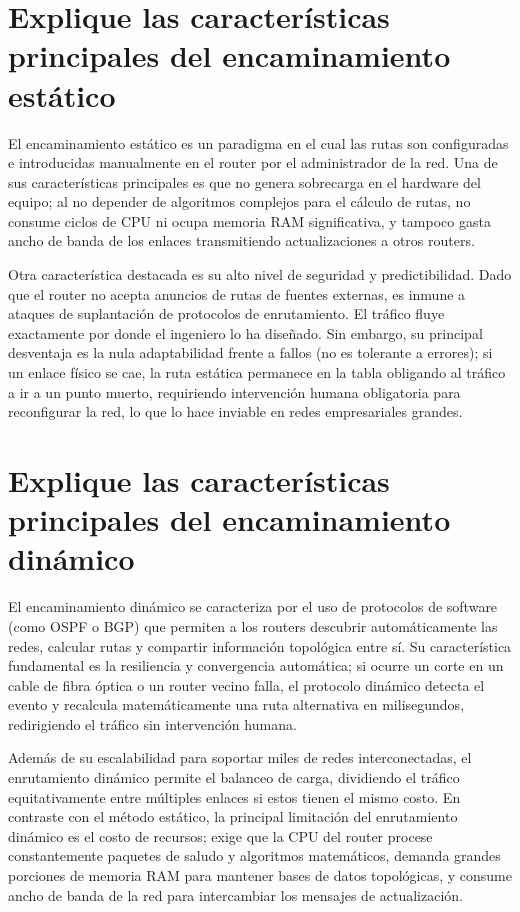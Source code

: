 \documentclass[a4paper,12pt]{article}
\begin{document}
\section{Explique las características principales del encaminamiento estático}

El encaminamiento estático es un paradigma en el cual las rutas son configuradas e introducidas manualmente en el router por el administrador de la red. Una de sus características principales es que no genera sobrecarga en el hardware del equipo; al no depender de algoritmos complejos para el cálculo de rutas, no consume ciclos de CPU ni ocupa memoria RAM significativa, y tampoco gasta ancho de banda de los enlaces transmitiendo actualizaciones a otros routers.

Otra característica destacada es su alto nivel de seguridad y predictibilidad. Dado que el router no acepta anuncios de rutas de fuentes externas, es inmune a ataques de suplantación de protocolos de enrutamiento. El tráfico fluye exactamente por donde el ingeniero lo ha diseñado. Sin embargo, su principal desventaja es la nula adaptabilidad frente a fallos (no es tolerante a errores); si un enlace físico se cae, la ruta estática permanece en la tabla obligando al tráfico a ir a un punto muerto, requiriendo intervención humana obligatoria para reconfigurar la red, lo que lo hace inviable en redes empresariales grandes.

\section{Explique las características principales del encaminamiento dinámico}

El encaminamiento dinámico se caracteriza por el uso de protocolos de software (como OSPF o BGP) que permiten a los routers descubrir automáticamente las redes, calcular rutas y compartir información topológica entre sí. Su característica fundamental es la resiliencia y convergencia automática; si ocurre un corte en un cable de fibra óptica o un router vecino falla, el protocolo dinámico detecta el evento y recalcula matemáticamente una ruta alternativa en milisegundos, redirigiendo el tráfico sin intervención humana.

Además de su escalabilidad para soportar miles de redes interconectadas, el enrutamiento dinámico permite el balanceo de carga, dividiendo el tráfico equitativamente entre múltiples enlaces si estos tienen el mismo costo. En contraste con el método estático, la principal limitación del enrutamiento dinámico es el costo de recursos; exige que la CPU del router procese constantemente paquetes de saludo y algoritmos matemáticos, demanda grandes porciones de memoria RAM para mantener bases de datos topológicas, y consume ancho de banda de la red para intercambiar los mensajes de actualización.
\end{document}
